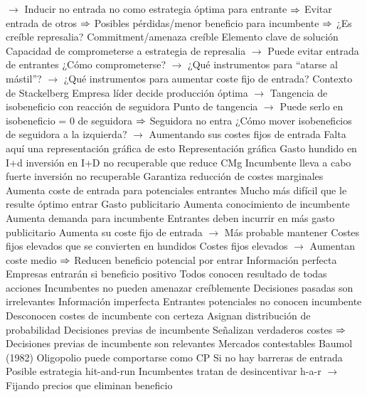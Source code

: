 \documentclass{nuevotema}
\begin{document}
\begin{esquemal}
				\4[] $\to$ Inducir no entrada no como estrategia óptima para entrante
				\4[] $\then$ Evitar entrada de otros
				\4[] $\then$ Posibles pérdidas/menor beneficio para incumbente
				\4[] $\then$ ¿Es creíble represalia?
				\4 Commitment/amenaza creíble
				\4[] Elemento clave de solución
				\4[] Capacidad de comprometerse a estrategia de represalia
				\4[] $\to$ Puede evitar entrada de entrantes
				\4[] ¿Cómo comprometerse?
				\4[] $\to$ ¿Qué instrumentos para ``atarse al mástil''?
				\4[] $\to$ ¿Qué instrumentos para aumentar coste fijo de entrada?
				\4 Contexto de Stackelberg
				\4[] Empresa líder decide producción óptima
				\4[] $\to$ Tangencia de isobeneficio con reacción de seguidora
				\4[] Punto de tangencia
				\4[] $\to$ Puede serlo en isobeneficio = 0 de seguidora
				\4[] $\then$ Seguidora no entra
				\4[] ¿Cómo mover isobeneficios de seguidora a la izquierda?
				\4[] $\to$ Aumentando sus costes fijos de entrada
				\4 Falta aquí una representación gráfica de esto
				\4 Representación gráfica
				\4[] 
			\3 Gasto hundido en I+d
				\4 inversión en I+D no recuperable que reduce CMg
				\4 Incumbente lleva a cabo fuerte inversión no recuperable
				\4 Garantiza reducción de costes marginales
				\4 Aumenta coste de entrada para potenciales entrantes
				\4[] Mucho más difícil que le resulte óptimo entrar
			\3 Gasto publicitario
				\4 Aumenta conocimiento de incumbente
				\4 Aumenta demanda para incumbente
				\4 Entrantes deben incurrir en más gasto publicitario
				\4[] Aumenta su coste fijo de entrada
				\4[] $\to$ Más probable mantener
			\3 Costes fijos elevados que se convierten en hundidos
				\4 Costes fijos elevados
				\4[] $\to$ Aumentan coste medio
				\4[] $\then$ Reducen beneficio potencial por entrar
			\3 Información perfecta
				\4 Empresas entrarán si beneficio positivo
				\4 Todos conocen resultado de todas acciones
				\4[$\then$] Incumbentes no pueden amenazar creíblemente
				\4[$\then$] Decisiones pasadas son irrelevantes
			\3 Información imperfecta
				\4 Entrantes potenciales no conocen incumbente
				\4[] Desconocen costes de incumbente con certeza
				\4[] Asignan distribución de probabilidad
				\4 Decisiones previas de incumbente
				\4[] Señalizan verdaderos costes
				\4[] $\then$ Decisiones previas de incumbente son relevantes
			\3 Mercados contestables
				\4 Baumol (1982)
				\4 Oligopolio puede comportarse como CP
				\4 Si no hay barreras de entrada
				\4[] Posible estrategia hit-and-run
				\4 Incumbentes tratan de desincentivar h-a-r
				\4[] $\to$ Fijando precios que eliminan beneficio

\end{esquemal}
\end{document}
